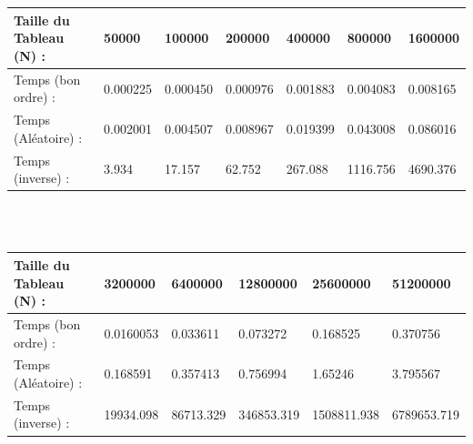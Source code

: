 \documentclass[12pt]{article}
\begin{document}
\color{blue}
\textrm{  }
\\
\\
\begin{tabular}{|p{4cm}||p{1.8cm}|p{1.8cm}|p{1.8cm}|p{1.8cm}|p{1.8cm}|p{1.8cm}|}
\hline
Taille du Tableau (N) : & 50000 & 100000 & 200000 & 400000 & 800000  & 1600000\\
\hline
Temps (bon ordre) : & 0.000225 & 0.000450 & 0.000976 & 0.001883 & 0.004083 & 0.008165  \\
\hline

Temps (Aléatoire) : & 0.002001 & 0.004507 & 0.008967 & 0.019399 & 0.043008 & 0.086016 \\
\hline

Temps (inverse) :  & 3.934 & 17.157 & 62.752 & 267.088 & 1116.756 & 4690.376   \\
\hline

\end{tabular}
\\
\\
\begin{tabular}{|p{4cm}||p{2.25cm}|p{2.25cm}|p{2.25cm}|p{2.25cm}|p{2.25cm}|}
\hline
Taille du Tableau (N) : & 3200000 & 6400000 & 12800000 & 25600000 &  51200000  \\
\hline

Temps (bon ordre) : & 0.0160053 & 0.033611 & 0.073272 & 0.168525 & 0.370756  \\
\hline

Temps (Aléatoire) : & 0.168591 & 0.357413 & 0.756994 & 1.65246 & 3.795567 \\
\hline

Temps (inverse) :& 19934.098 & 86713.329 & 346853.319 & 1508811.938 & 6789653.719 \\
\hline

\end{tabular}
\color{black}
\end{document}
